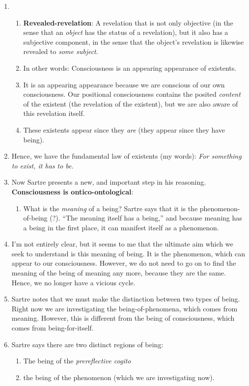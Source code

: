 \begin{enumerate}
  \item {}
  \begin{enumerate}
    \item \textbf{Revealed-revelation}: A revelation that is not only objective (in the sense that an \emph{object} has the status of a revelation), but it also has a subjective component, in the sense that the object's revelation is likewise revealed to \emph{some subject}.
    \item In other words: Consciousness is an appearing appearance of existents.
    \item It is an appearing appearance because we are conscious of our own consciousness. Our positional consciousness contains the posited \emph{content} of the existent (the revelation of the existent), but we are also aware of this revelation itself.
    \item These existents appear since they \emph{are} (they appear since they have being).
  \end{enumerate}
  \item Hence, we have the fundamental law of existents (my words): \emph{For something to exist, it has to be.}
  \item Now Sartre presents a new, and important step in his reasoning. \textbf{Consciousness is ontico-ontological}: 
  \begin{enumerate}
    \item What is the \emph{meaning} of a being? Sartre says that it is the phenomenon-of-being (?). \enquote{The meaning itself has a being,} and because meaning has a being in the first place, it can manifest itself as a phenomenon.
  \end{enumerate}
  \item I'm not entirely clear, but it seems to me that the ultimate aim which we seek to understand is this meaning of being. It is the phenomenon, which can appear to our consciousness. However, we do not need to go on to find the meaning of the being of meaning any more, because they are the same. Hence, we no longer have a vicious cycle.
  \item Sartre notes that we must make the distinction between two types of being. Right now we are investigating the being-of-phenomena, which comes from meaning. However, this is different from the being of consciousness, which comes from being-for-itself.
  \item Sartre says there are two distinct regions of being:
  \begin{enumerate}
    \item The being of the \emph{prereflective cogito}
    \item the being of the phenomenon (which we are investigating now).
  \end{enumerate}
\end{enumerate}
